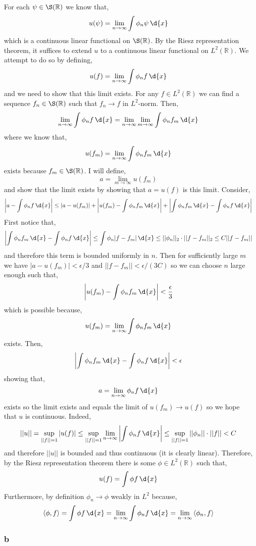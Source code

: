 \documentclass[12pt]{article}
\newcommand{\inner}[2]{\left< #1, #2 \right>}
\newcommand{\R}{\mathbb{R}}
\begin{document}
For each $\psi \in \S(\R)$ we know that,
\[ u(\psi) = \lim_{n \to \infty} \int \phi_n \psi \, \d{x} \]
which is a continuous linear functional on $\S(\R)$. By the Riesz representation theorem, it suffices to extend $u$ to a continuous linear functional on $L^2(\R)$. We attempt to do so by defining,
\[ u(f) = \lim_{n \to \infty} \int \phi_n f \, \d{x} \]
and we need to show that this limit exists. For any $f \in L^2(\R)$ we can find a sequence $f_n \in \S(\R)$ such that $f_n \to f$ in $L^2$-norm. Then,
\[ \lim_{n \to \infty} \int \phi_n f \, \d{x} = \lim_{n \to \infty} \lim_{m \to \infty} \int \phi_n f_m \, \d{x} \]
where we know that,
\[ u(f_m) = \lim_{n \to \infty} \int \phi_n f_m \, \d{x} \]
exists because $f_m \in \S(\R)$. I will define,
\[ a = \lim_{m \to \infty} u(f_m) \]
and show that the limit exists by showing that $a = u(f)$ is this limit. Consider,
\[ \left| a - \int \phi_n f \, \d{x} \right| \le |a - u(f_m)| + \left| u(f_m) - \int \phi_n f_m \, \d{x} \right| + \left| \int \phi_n f_m \, \d{x} - \int \phi_n f \, \d{x} \right| \]
First notice that,
\[ \left| \int \phi_n f_m \, \d{x} - \int \phi_n f \, \d{x} \right| \le \int \phi_n | f - f_m | \, \d{x} \le || \phi_n ||_2 \cdot || f - f_m ||_2 \le C || f - f_m || \]
and therefore this term is bounded uniformly in $n$. Then for sufficiently large $m$ we have $| a - u(f_m) | < \epsilon / 3$ and $|| f - f_m || < \epsilon / (3 C)$ so we can choose $n$ large enough such that,
\[ \left| u(f_m) - \int \phi_n f_m \, \d{x} \right| < \frac{\epsilon}{3} \]
which is possible because,
\[ u(f_m) = \lim_{n \to \infty} \int \phi_n f_m \, \d{x} \]
exists. Then,
\[ \left| \int \phi_n f_m \, \d{x} - \int \phi_n f \, \d{x} \right| < \epsilon \]
showing that,
\[ a = \lim_{n \to \infty} \phi_n f \, \d{x} \]
exists so the limit exists and equals the limit of $u(f_m) \to u(f)$ so we hope that $u$ is continuous. Indeed,
\[ || u || = \sup_{|| f || = 1} |u(f)| \le \sup_{|| f || = 1} \lim_{n \to \infty} \left| \int \phi_n f \, \d{x} \right| \le \sup_{|| f|| = 1} || \phi_n || \cdot || f || < C \]
and therefore $|| u ||$ is bounded and thus continuous (it is clearly linear). Therefore, by the Riesz representation theorem there is some $\phi \in L^2(\R)$ such that,
\[ u(f) = \int \phi f \, \d{x} \]
Furthermore, by definition $\phi_n \to \phi$ weakly in $L^2$ because,
\[ \inner{\phi}{f} = \int \phi f \, \d{x} = \lim_{n \to \infty} \int \phi_n f \, \d{x} = \lim_{n \to \infty} \inner{\phi_n}{f} \]

\subsubsection{b}
\end{document}

